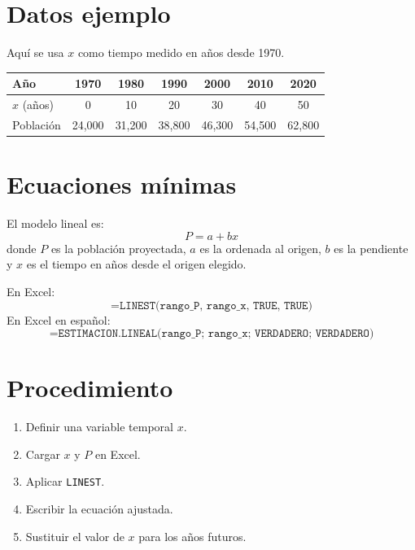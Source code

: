\documentclass[12pt]{article}
\begin{document}

\section{Datos ejemplo}
Aquí se usa $x$ como tiempo medido en años desde 1970.

\begin{center}
\begin{tabular}{lcccccc}
\toprule
Año & 1970 & 1980 & 1990 & 2000 & 2010 & 2020 \\
\midrule
$x$ (años) & 0 & 10 & 20 & 30 & 40 & 50 \\
Población & 24,000 & 31,200 & 38,800 & 46,300 & 54,500 & 62,800 \\
\bottomrule
\end{tabular}
\end{center}

\section{Ecuaciones mínimas}
El modelo lineal es:
\begin{equation}
P=a+bx
\end{equation}
donde $P$ es la población proyectada, $a$ es la ordenada al origen, $b$ es la pendiente y $x$ es el tiempo en años desde el origen elegido.

En Excel:
\[
\texttt{=LINEST(rango\_P, rango\_x, TRUE, TRUE)}
\]
En Excel en español:
\[
\texttt{=ESTIMACION.LINEAL(rango\_P; rango\_x; VERDADERO; VERDADERO)}
\]


\section{Procedimiento}
\begin{enumerate}
\item Definir una variable temporal $x$.
\item Cargar $x$ y $P$ en Excel.
\item Aplicar \texttt{LINEST}.
\item Escribir la ecuación ajustada.
\item Sustituir el valor de $x$ para los años futuros.
\end{enumerate}
\end{document}
